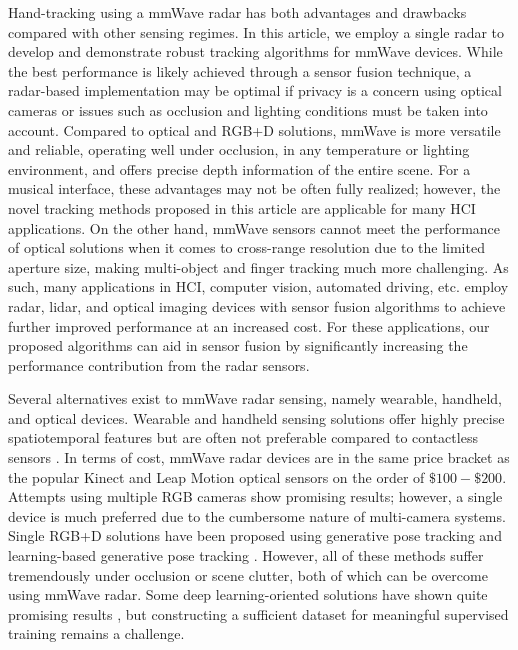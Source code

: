 \documentclass[10pt,journal,final]{IEEEtran}
\begin{document}
Hand-tracking using a mmWave radar has both advantages and drawbacks compared with other sensing regimes.
In this article, we employ a single radar to develop and demonstrate robust tracking algorithms for mmWave devices.
While the best performance is likely achieved through a sensor fusion technique, a radar-based implementation may be optimal if privacy is a concern using optical cameras or issues such as occlusion and lighting conditions must be taken into account.
Compared to optical and RGB+D solutions, mmWave is more versatile and reliable, operating well under occlusion, in any temperature or lighting environment, and offers precise depth information of the entire scene.
For a musical interface, these advantages may not be often fully realized; however, the novel tracking methods proposed in this article are applicable for many HCI applications.
On the other hand, mmWave sensors cannot meet the performance of optical solutions when it comes to cross-range resolution due to the limited aperture size, making multi-object and finger tracking much more challenging. 
As such, many applications in HCI, computer vision, automated driving, etc. employ radar, lidar, and optical imaging devices with sensor fusion algorithms to achieve further improved performance at an increased cost. 
For these applications, our proposed algorithms can aid in sensor fusion by significantly increasing the performance contribution from the radar sensors.

Several alternatives exist to mmWave radar sensing, namely wearable, handheld, and optical devices. 
Wearable and handheld sensing solutions offer highly precise spatiotemporal features but are often not preferable compared to contactless sensors \cite{pardue2013hand,neto2010high}.
In terms of cost, mmWave radar devices are in the same price bracket as the popular Kinect and Leap Motion optical sensors on the order of $\$100-\$200$.
Attempts using multiple RGB cameras \cite{ballan2012motion,sridhar2013interactive} show promising results; however, a single device is much preferred due to the cumbersome nature of multi-camera systems. 
Single RGB+D solutions have been proposed using generative pose tracking \cite{oikonomidis2011efficient,tang2015opening} and learning-based generative pose tracking \cite{sridhar2015fast,taylor2016efficient}.
However, all of these methods suffer tremendously under occlusion or scene clutter, both of which can be overcome using mmWave radar. 
Some deep learning-oriented solutions have shown quite promising results \cite{tompson2014real,ye2016spatial}, but constructing a sufficient dataset for meaningful supervised training remains a challenge. 
\end{document}
